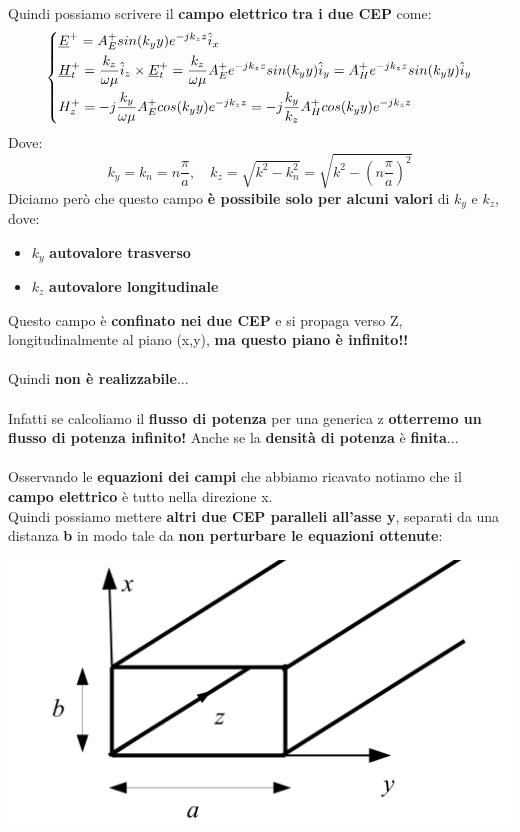 Quindi possiamo scrivere il \textbf{campo elettrico} \textbf{tra i due CEP} come:
\begin{equation*}
\begin{dcases}
    \underline{E}^+ = A^+_E sin(k_y y) e^{-j k_z z} \hat{i}_x\\
    \underline{H}^+_t = \frac{k_z}{\omega \mu} \hat{i}_z \times \underline{E}^+_t = \frac{k_z}{\omega \mu} A^+_E e^{-j k_z z}sin(k_y y) \hat{i}_y = A^+_H e^{-j k_z z}sin(k_y y) \hat{i}_y\\
    H^+_z = -j \frac{k_y}{\omega \mu} A^+_E cos(k_y y) e^{-j k_z z} = -j \frac{k_y}{k_z} A^+_H cos(k_y y) e^{-j k_z z}
\end{dcases}
\end{equation*}
Dove:
\begin{equation*}
    k_y = k_n = n \frac{\pi}{a}, \quad k_z = \sqrt{k^2 - k_n^2} = \sqrt{k^2 -  \left(n \frac{\pi}{a}\right)^2}
\end{equation*}
Diciamo però che questo campo \textbf{è possibile solo per alcuni valori} di $k_y$ e $k_z$, dove:
\begin{itemize}
    \item $k_y$ \textbf{autovalore trasverso}
    \item $k_z$ \textbf{autovalore longitudinale}
\end{itemize}
Questo campo è \textbf{confinato nei due CEP} e si propaga verso Z, longitudinalmente al piano (x,y), \textbf{ma questo piano è infinito!!}\\ \\
Quindi \textbf{non è realizzabile}...\\ \\
Infatti se calcoliamo il \textbf{flusso di potenza} per una generica z \textbf{otterremo un flusso di potenza infinito!} Anche se la \textbf{densità di potenza} è \textbf{finita}...\\ \\
Osservando le \textbf{equazioni dei campi} che abbiamo ricavato notiamo che il \textbf{campo elettrico} è tutto nella direzione x.\\
Quindi possiamo mettere \textbf{altri due CEP paralleli all'asse y}, separati da una distanza \textbf{b} in modo tale da \textbf{non perturbare le equazioni ottenute}:
\begin{center}
    \includegraphics[width=.6\textwidth]{Images/figure44.png}
\end{center}
